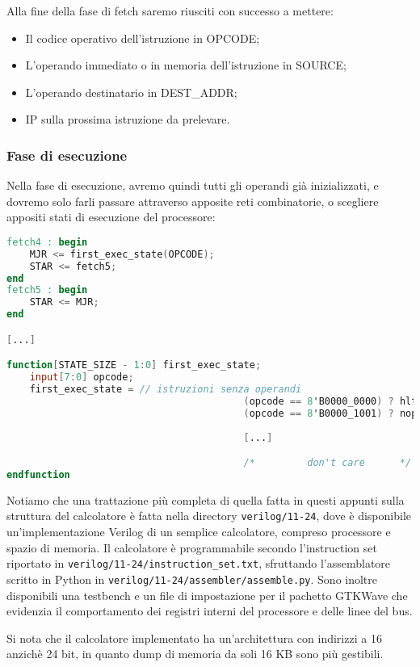 \documentclass[a4paper,11pt]{article}
\begin{document}
Alla fine della fase di fetch saremo riusciti con successo a mettere:
\begin{itemize}
	\item Il codice operativo dell'istruzione in OPCODE;
	\item L'operando immediato o in memoria dell'istruzione in SOURCE;
	\item L'operando destinatario in DEST\_ADDR;
	\item IP sulla prossima istruzione da prelevare.
\end{itemize}

\subsubsection{Fase di esecuzione}
Nella fase di esecuzione, avremo quindi tutti gli operandi già inizializzati, e dovremo solo farli passare attraverso apposite reti combinatorie, o scegliere appositi stati di esecuzione del processore:

\begin{lstlisting}[language=verilog, style=codestyle]	
fetch4 : begin
	MJR <= first_exec_state(OPCODE);
	STAR <= fetch5;
end
fetch5 : begin
	STAR <= MJR;
end

[...]

function[STATE_SIZE - 1:0] first_exec_state;
	input[7:0] opcode;
	first_exec_state = // istruzioni senza operandi 
										 (opcode == 8'B0000_0000) ? hlt:
										 (opcode == 8'B0000_1001) ? nop:
											
										 [...]

										 /*			don't care		*/   nvi;
endfunction
\end{lstlisting}

\par\medskip

Notiamo che una trattazione più completa di quella fatta in questi appunti sulla struttura del calcolatore è fatta nella directory \lstinline|verilog/11-24|, dove è disponibile un'implementazione Verilog di un semplice calcolatore, compreso processore e spazio di memoria.
Il calcolatore è programmabile secondo l'instruction set riportato in \lstinline|verilog/11-24/instruction_set.txt|, sfruttando l'assemblatore scritto in Python in \lstinline|verilog/11-24/assembler/assemble.py|.
Sono inoltre disponibili una testbench e un file di impostazione per il pachetto GTKWave che evidenzia il comportamento dei registri interni del processore e delle linee del bus.

Si nota che il calcolatore implementato ha un'architettura con indirizzi a 16 anzichè 24 bit, in quanto dump di memoria da soli 16 KB sono più gestibili.
\end{document}
